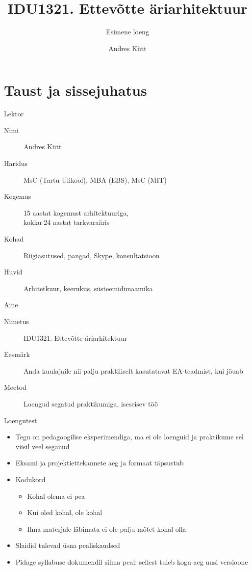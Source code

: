 \documentclass{beamer}
\title{IDU1321. Ettevõtte äriarhitektuur}
\subtitle{Esimene loeng}
\author{Andres Kütt}
\institute{Cybernetica, arhitekt}
\begin{document}
\begin{frame}
\titlepage
\end{frame}

\section{Taust ja sissejuhatus}
\begin{frame}{Lektor}

	\begin{description}
		\item[Nimi] Andres Kütt
		\item[Haridus] MsC (Tartu Ülikool), MBA (EBS), MsC (MIT)
		\item[Kogemus] 15 aastat kogemust arhitektuuriga,\\ kokku 24 aastat tarkvaraäris 
		\item[Kohad] Riigiasutused, pangad, Skype, konsultatsioon
		\item[Huvid] Arhitetkuur, keerukus, süsteemidünaamika
	\end{description}
\end{frame}

\begin{frame}{Aine}
	\begin{description}
		\item[Nimetus] IDU1321. Ettevõtte äriarhitektuur
		\item[Eesmärk] Anda kuulajaile nii palju praktiliselt kasutatavat EA-teadmist, kui jõuab
		\item[Meetod] Loengud segatud praktikumiga, iseseisev töö
	\end{description}
\end{frame}

\begin{frame}{Loengutest}
	\begin{itemize}
		\item Tegu on pedagoogilise eksperimendiga, ma ei ole loenguid ja praktikume sel viisil veel seganud
		\item Eksami ja projektiettekannete aeg ja formaat täpsustub
		\item Kodukord
		\begin{itemize}
			\item Kohal olema ei pea
			\item Kui oled kohal, ole kohal
			\item Ilma materjale läbimata ei ole palju mõtet kohal olla
		\end{itemize}
		\item Slaidid tulevad üsna pealiskaudsed
		\item Pidage syllabuse dokumendil silma peal: sellest tuleb kogu aeg uusi versioone
	\end{itemize}
\end{frame}
\end{document}
